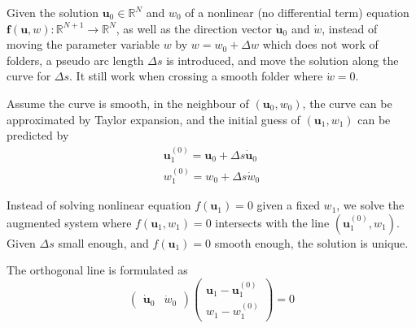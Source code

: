 \documentclass[10pt,letterpaper]{article}
\begin{document}
Given the solution $\mathbf u_0 \in \mathbb R^N$ and $w_0$ of a nonlinear (no differential term) equation $\mathbf f(\mathbf u,w): \mathbb R^{N+1} \rightarrow \mathbb R^{N}$, as well as the direction vector $\dot{\mathbf u}_0$ and $\dot{w}$, instead of moving the parameter variable $w$ by $w=w_0 +\Delta w$ which does not work of folders, a pseudo arc length $\Delta s$ is introduced, and move the solution along the curve for $\Delta s$. It still work when crossing a smooth folder where $\dot{w}=0$. 

Assume the curve is smooth, in the neighbour of $(\mathbf u_0, w_0)$, the curve can be approximated by Taylor expansion, and the initial guess of $(\mathbf u_1, w_1)$ can be predicted by 
\begin{equation}
\begin{aligned}
\mathbf u_1^{(0)} = \mathbf u_0 + \Delta s \dot{\mathbf u}_0
\\
w_1^{(0)} = w_0 + \Delta s \dot{w}_0
\end{aligned}
\end{equation}

Instead of solving nonlinear equation $f(\mathbf u_1)=0$ given a fixed $w_1$, we solve the augmented system where $f(\mathbf u_1,w_1)=0$ intersects with the line $(\mathbf u_1^{(0)}, w_1)$. Given $\Delta s$ small enough, and $f(\mathbf u_1)=0$ smooth enough, the solution is unique. 

The orthogonal line is formulated as
\begin{equation}
\begin{pmatrix}
\dot{\mathbf u}_0
&\dot{w}_0
\end{pmatrix}
\begin{pmatrix}
\mathbf u_1 -\mathbf u_1^{(0)}
\\w_1 -w_1^{(0)}
\end{pmatrix}
=0
\end{equation}
\end{document}
